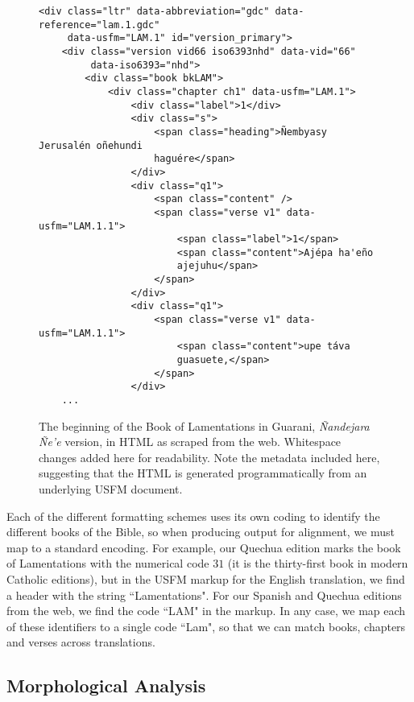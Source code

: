 \begin{figure*}
\raggedright \begin{verbatim}
<div class="ltr" data-abbreviation="gdc" data-reference="lam.1.gdc"
     data-usfm="LAM.1" id="version_primary">
    <div class="version vid66 iso6393nhd" data-vid="66"
         data-iso6393="nhd">
        <div class="book bkLAM">
            <div class="chapter ch1" data-usfm="LAM.1">
                <div class="label">1</div>
                <div class="s">
                    <span class="heading">Ñembyasy Jerusalén oñehundi
                    haguére</span>
                </div>
                <div class="q1">
                    <span class="content" />
                    <span class="verse v1" data-usfm="LAM.1.1">
                        <span class="label">1</span>
                        <span class="content">Ajépa ha'eño
                        ajejuhu</span>
                    </span>
                </div>
                <div class="q1">
                    <span class="verse v1" data-usfm="LAM.1.1">
                        <span class="content">upe táva
                        guasuete,</span>
                    </span>
                </div>
    ...
\end{verbatim}
  \caption{The beginning of the Book of Lamentations in Guarani,
  \emph{Ñandejara Ñe'e} version, in HTML as scraped from the web. Whitespace
  changes added here for readability. Note the metadata included here,
  suggesting that the HTML is generated programmatically from an underlying
  USFM document.}
  \label{fig:gn-html-sample}
\end{figure*}

Each of the different formatting schemes uses its own coding to identify the
different books of the Bible, so when producing output for alignment, we must
map to a standard encoding. For example, our Quechua edition marks the book of
Lamentations with the numerical code $31$ (it is the thirty-first book in
modern Catholic editions), but in the USFM markup for the English translation,
we find a header with the string ``Lamentations". For our Spanish and Quechua
editions from the web, we find the code ``LAM" in the markup. In any case, we
map each of these identifiers to a single code ``Lam", so that we can match
books, chapters and verses across translations.

\subsection{Morphological Analysis}
\label{sec:guaranima}

